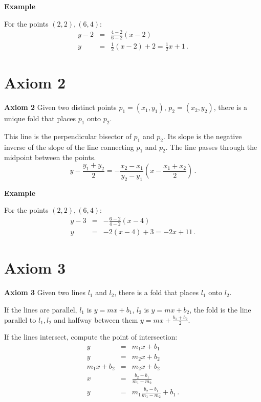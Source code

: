 \documentclass[11pt,a4paper]{article}
\newcommand*{\disfrac}[2]{\displaystyle\frac{#1}{#2}}
\newenvironment{form}[1]{%
\begin{displaymath}%
\renewcommand{\arraystretch}{#1}%
\begin{array}{lcl}}%
{\end{array}%
\end{displaymath}%
}
\begin{document}
\textbf{Example}

For the points $(2,2), (6,4)$:
\begin{form}{1.5}
y-2&=&\disfrac{4-2}{6-2}(x-2)\\
y&=&\disfrac{1}{2}(x-2)+2=\disfrac{1}{2}x+1\,.
\end{form}



\section{Axiom 2}


\textbf{Axiom 2} 
Given two distinct points $p_1=(x_1,y_1)$, $p_2=(x_2,y_2)$, there is a unique fold that places $p_1$ onto $p_2$.

This line is the perpendicular bisector of $p_1$ and $p_2$. Its slope is the negative inverse of the slope of the line connecting $p_1$ and $p_2$. The line passes through the midpoint between the points.
\begin{equation}
y - \disfrac{y_1+y_2}{2} = -\disfrac{x_2-x_1}{y_2-y_1}\left(x-\disfrac{x_1+x_2}{2}\right)\,.\label{eq.midpoint}
\end{equation}

\textbf{Example}

For the points $(2,2), (6,4)$:
\begin{form}{1.5}
y-3&=&-\disfrac{6-2}{4-2}(x-4)\\
y&=&-2(x-4)+3=-2x+11\,.
\end{form}



\section{Axiom 3}


\textbf{Axiom 3} 
Given two lines $l_1$ and $l_2$, there is a fold that places $l_1$ onto $l_2$.

If the lines are parallel, $l_1$ is $y=mx+b_1$, $l_2$ is $y=mx+b_2$, the fold is the line parallel to $l_1,l_2$ and halfway between them $y=mx+\disfrac{b_1+b_2}{2}$.

If the lines intersect, compute the point of intersection:
\begin{form}{1.5}
y&=&m_1x+b_1\\
y&=&m_2x+b_2\\
m_1x+b_2&=&m_2x+b_2\\
x &=& \disfrac{b_2-b_1}{m_1-m_2}\\
y &=&m_1\disfrac{b_2-b_1}{m_1-m_2}+b_1\,.
\end{form}
\end{document}
